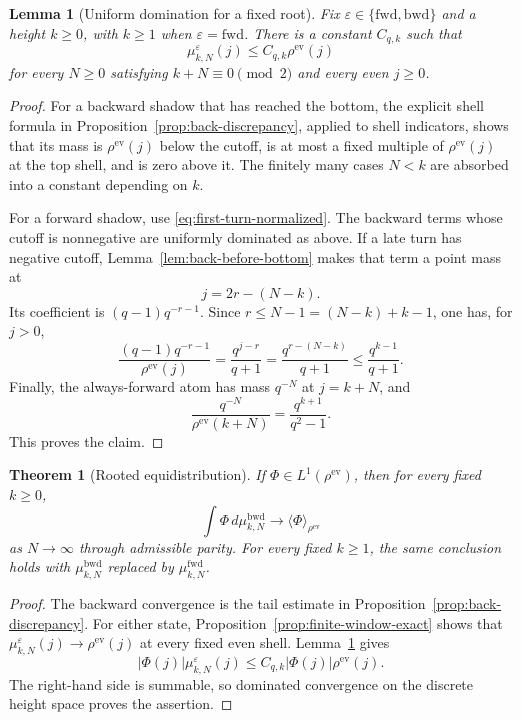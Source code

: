 \documentclass[11pt]{amsart}
\theoremstyle{definition}
\theoremstyle{plain}
\newtheorem{lemma}[definition]{Lemma}
\newtheorem{theorem}[definition]{Theorem}
\newcommand{\fwd}{\mathrm{fwd}}
\newcommand{\bwd}{\mathrm{bwd}}
\newcommand{\ev}{\mathrm{ev}}
\newcommand{\ang}{\langle}
\newcommand{\rang}{\rangle}
\begin{document}
\begin{lemma}[Uniform domination for a fixed root]\label{lem:fixed-domination}
Fix \(\varepsilon\in\{\fwd,\bwd\}\) and a height \(k\ge0\), with \(k\ge1\)
when \(\varepsilon=\fwd\).  There is a constant \(C_{q,k}\) such that
\[
\mu^\varepsilon_{k,N}(j)\le C_{q,k}\rho^{\ev}(j)
\]
for every \(N\ge0\) satisfying \(k+N\equiv0\pmod2\) and every even
\(j\ge0\).
\end{lemma}

\begin{proof}
For a backward shadow that has reached the bottom, the explicit shell formula
in Proposition~\ref{prop:back-discrepancy}, applied to shell indicators, shows
that its mass is \(\rho^{\ev}(j)\) below the cutoff, is at most a fixed
multiple of \(\rho^{\ev}(j)\) at the top shell, and is zero above it.  The
finitely many cases \(N<k\) are absorbed into a constant depending on \(k\).

For a forward shadow, use \eqref{eq:first-turn-normalized}.  The backward terms
whose cutoff is nonnegative are uniformly dominated as above.  If a late turn
has negative cutoff, Lemma~\ref{lem:back-before-bottom} makes that term a point
mass at
\[
j=2r-(N-k).
\]
Its coefficient is \((q-1)q^{-r-1}\).  Since
\(r\le N-1=(N-k)+k-1\), one has, for \(j>0\),
\[
\frac{(q-1)q^{-r-1}}{\rho^{\ev}(j)}
 =\frac{q^{j-r}}{q+1}
 =\frac{q^{r-(N-k)}}{q+1}
 \le\frac{q^{k-1}}{q+1}.
\]
Finally, the always-forward atom has mass \(q^{-N}\) at \(j=k+N\), and
\[
\frac{q^{-N}}{\rho^{\ev}(k+N)}
 =\frac{q^{k+1}}{q^2-1}.
\]
This proves the claim.
\end{proof}

\begin{theorem}[Rooted equidistribution]\label{thm:rooted-equidistribution}
If \(\Phi\in L^1(\rho^{\ev})\), then for every fixed \(k\ge0\),
\[
\int \Phi\,d\mu^{\bwd}_{k,N}\to \ang\Phi\rang_{\rho^{\ev}}
\]
as \(N\to\infty\) through admissible parity.
For every fixed \(k\ge1\), the same conclusion holds with
\(\mu^{\bwd}_{k,N}\) replaced by \(\mu^{\fwd}_{k,N}\).
\end{theorem}

\begin{proof}
The backward convergence is the tail estimate in
Proposition~\ref{prop:back-discrepancy}.  For either state,
Proposition~\ref{prop:finite-window-exact} shows that
\(\mu^\varepsilon_{k,N}(j)\to\rho^{\ev}(j)\) at every fixed even shell.
Lemma~\ref{lem:fixed-domination} gives
\[
|\Phi(j)|\mu^\varepsilon_{k,N}(j)
\le C_{q,k}|\Phi(j)|\rho^{\ev}(j).
\]
The right-hand side is summable, so dominated convergence on the discrete
height space proves the assertion.
\end{proof}
\end{document}
